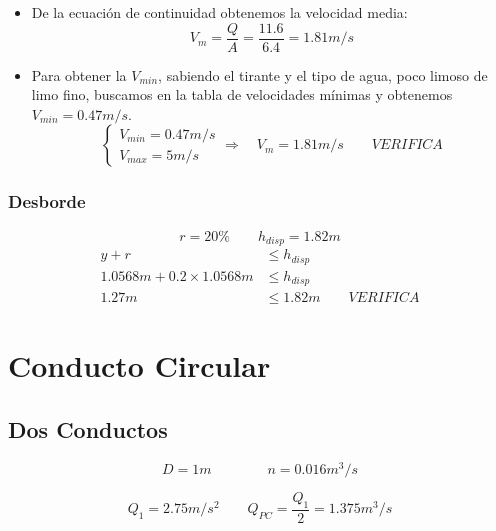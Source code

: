 \documentclass[10.5pt]{article}
\begin{document}
\begin{itemize}
 \item De la ecuación de continuidad obtenemos la velocidad media:
    \begin{equation*}
    V_{m} = \dfrac{Q}{A} = \dfrac{11.6}{6.4} = 1.81 m/s
    \end{equation*}
 \item Para obtener la $V_{min}$, sabiendo el tirante y el tipo de agua, poco limoso de limo fino, buscamos en
 la tabla de velocidades mínimas y obtenemos $V_{min} = 0.47 m/s$.
    \begin{equation*}
      \begin{cases}
      V_{min} = 0.47 m/s \\
      V_{max} = 5 m/s
      \end{cases}
      \Longrightarrow \quad
      V_{m} = 1.81 m/s
      \qquad
      VERIFICA
    \end{equation*}
\end{itemize}

\subsubsection*{Desborde}

\begin{equation*}
 r = 20\%
 \qquad
 h_{disp} = 1.82 m
\end{equation*}
\begin{align*}
 y + r &\leq h_{disp} \\
 1.0568 m + 0.2 \times 1.0568 m &\leq h_{disp} \\
 1.27 m &\leq 1.82 m
 \qquad
 VERIFICA
\end{align*}


\section*{Conducto Circular}

\subsection*{Dos Conductos}

\begin{equation*}
  D = 1 m
 \qquad
 \qquad
  n = 0.016 m^3/s
\end{equation*}

\begin{equation*}
  Q_{1} = 2.75 m/s^{2}
 \qquad
  Q_{PC} = \dfrac{Q_{1}}{2} = 1.375 m^{3}/s
\end{equation*}
\end{document}
